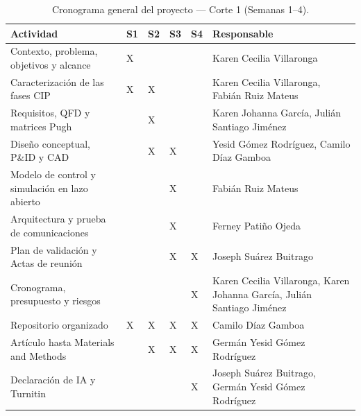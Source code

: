 \begin{table}[H]\centering\scriptsize
\caption{Cronograma general del proyecto — Corte 1 (Semanas 1--4).}
\label{tab:cronograma-corte1}
\begin{tabularx}{\textwidth}{L{4.0cm}*{4}{C{0.9cm}}L{4.3cm}}\toprule
\textbf{Actividad} & \textbf{S1} & \textbf{S2} & \textbf{S3} & \textbf{S4} & \textbf{Responsable}\\\midrule
Contexto, problema, objetivos y alcance & X & & & & Karen Cecilia Villaronga\\
Caracterización de las fases CIP & X & X & & & Karen Cecilia Villaronga, Fabián Ruiz Mateus\\
Requisitos, QFD y matrices Pugh & & X & & & Karen Johanna García, Julián Santiago Jiménez\\
Diseño conceptual, P\&ID y CAD & & X & X & & Yesid Gómez Rodríguez, Camilo Díaz Gamboa\\
Modelo de control y simulación en lazo abierto & & & X & & Fabián Ruiz Mateus\\
Arquitectura y prueba de comunicaciones & & & X & & Ferney Patiño Ojeda\\
Plan de validación y Actas de reunión & & & X & X & Joseph Suárez Buitrago\\
Cronograma, presupuesto y riesgos & & & & X & Karen Cecilia Villaronga, Karen Johanna García, Julián Santiago Jiménez\\\bottomrule
Repositorio organizado & X & X & X & X & Camilo Díaz Gamboa\\
Artículo hasta Materials and Methods & & X & X & X & Germán Yesid Gómez Rodríguez\\
Declaración de IA y Turnitin & & & & X & Joseph Suárez Buitrago, Germán Yesid Gómez Rodríguez\\\bottomrule
\end{tabularx}\end{table}
